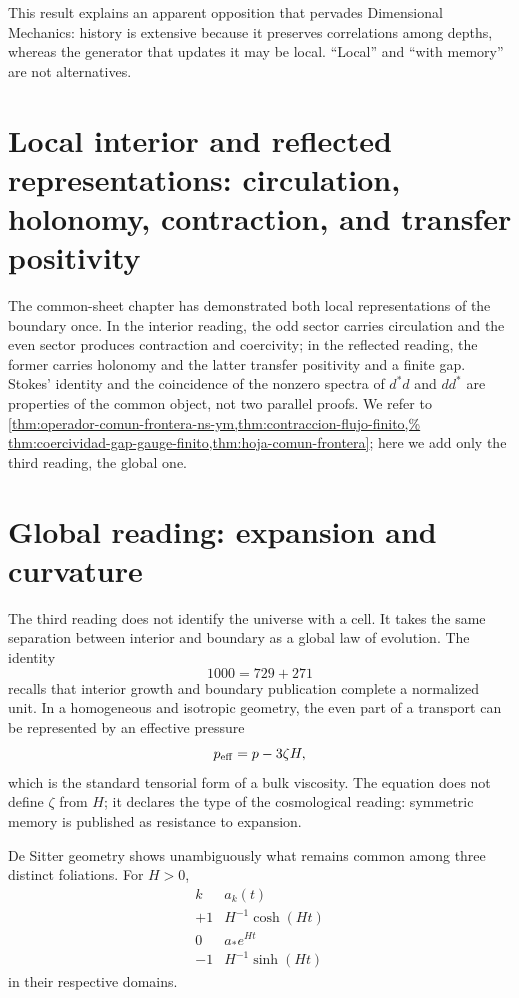 This result explains an apparent opposition that pervades Dimensional
Mechanics: history is extensive because it preserves correlations among
depths, whereas the generator that updates it may be local.
``Local'' and ``with memory'' are not alternatives.

\section{Local interior and reflected representations: circulation, holonomy, contraction, and transfer positivity}

The common-sheet chapter has demonstrated both local representations of the
boundary once. In the interior reading, the odd sector carries circulation
and the even sector produces contraction and coercivity; in the reflected
reading, the former carries holonomy and the latter transfer positivity and
a finite gap. Stokes' identity and the coincidence of the nonzero
spectra of \(d^\ast d\) and \(dd^\ast\) are properties of the common
object, not two parallel proofs. We refer to
\cref{thm:operador-comun-frontera-ns-ym,thm:contraccion-flujo-finito,%
thm:coercividad-gap-gauge-finito,thm:hoja-comun-frontera}; here we add
only the third reading, the global one.

\section{Global reading: expansion and curvature}

The third reading does not identify the universe with a cell. It takes the same
separation between interior and boundary as a global law of evolution. The
identity
\[
 1000=729+271
\]
recalls that interior growth and boundary publication complete
a normalized unit.  In a homogeneous and isotropic geometry, the even part
of a transport can be represented by an effective pressure
\[
 p_{\rm eff}=p-3\zeta H,
\]
which is the standard tensorial form of a bulk viscosity. The equation does
not define \(\zeta\) from \(H\); it declares the type of the
cosmological reading: symmetric memory is published as resistance to
expansion.

De Sitter geometry shows unambiguously what remains common among
three distinct foliations.  For \(H>0\),
\[
\begin{array}{c|c}
k&a_k(t)\\ \hline
+1&H^{-1}\cosh(Ht)\\
0&a_\ast e^{Ht}\\
-1&H^{-1}\sinh(Ht)
\end{array}
\]
in their respective domains.

